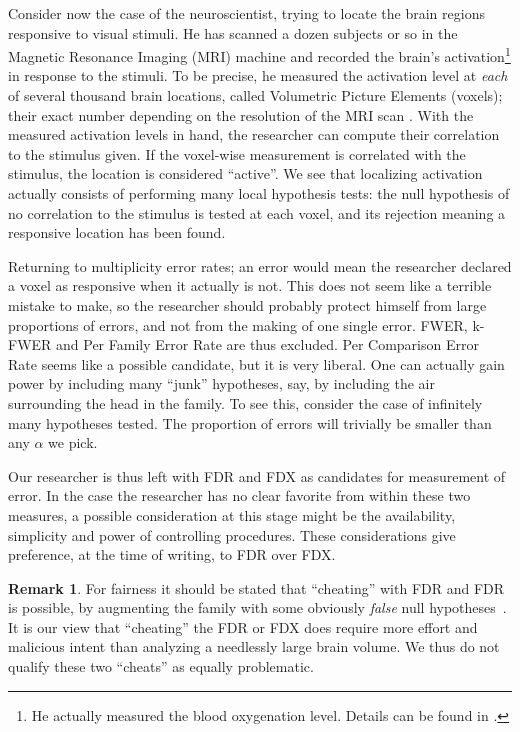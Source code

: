 \documentclass[review,12pt]{article}
\theoremstyle{definition}
\theoremstyle{definition}
\newtheorem{remark}{Remark}[section]
\begin{document}
Consider now the case of the neuroscientist, trying to locate the brain regions responsive to visual stimuli. He has scanned a dozen subjects or so in the Magnetic Resonance Imaging (MRI) machine and recorded the brain's activation\footnote{ He actually measured the blood oxygenation level. Details can be found in \cite{lazar_statistical_2008}.} in response to the stimuli. To be precise, he measured the activation level at \emph{each} of several thousand brain locations, called Volumetric Picture Elements (voxels); their exact number depending on the resolution of the MRI scan . With the measured activation levels in hand, the researcher can compute their correlation to the stimulus given. If the voxel-wise measurement is correlated with the stimulus, the location is considered ``active''. We see that localizing activation actually consists of performing many local hypothesis tests: the null hypothesis of no correlation to the stimulus is tested at each voxel, and its rejection meaning a responsive location has been found.

Returning to multiplicity error rates; an error would mean the researcher declared a voxel as responsive when it actually is not. This does not seem like a terrible mistake to make, so the researcher should probably protect himself from large proportions of errors, and not from the making of one single error. FWER, k-FWER and Per Family Error Rate are thus excluded. Per Comparison Error Rate seems like a possible candidate, but it is very liberal. One can actually gain power by including many ``junk'' hypotheses, say, by including the air surrounding the head in the family. To see this, consider the case of infinitely many hypotheses tested. The proportion of errors will trivially be smaller than any $\alpha$ we pick. 

Our researcher is thus left with FDR and FDX as candidates for measurement of error. 
In the case the researcher has no clear favorite from within these two measures, a possible consideration at this stage might be the availability, simplicity and power of controlling procedures. These considerations give preference, at the time of writing, to FDR over FDX. 

\begin{remark}
For fairness it should be stated that ``cheating'' with FDR and FDR is possible, by augmenting the family with some obviously \emph{false} null hypotheses~\cite{finner_false_2001}. 
It is our view that ``cheating'' the FDR or FDX does require more effort and malicious intent than analyzing a needlessly large brain volume. We thus do not qualify these two ``cheats'' as equally problematic.
\end{remark}
\end{document}
